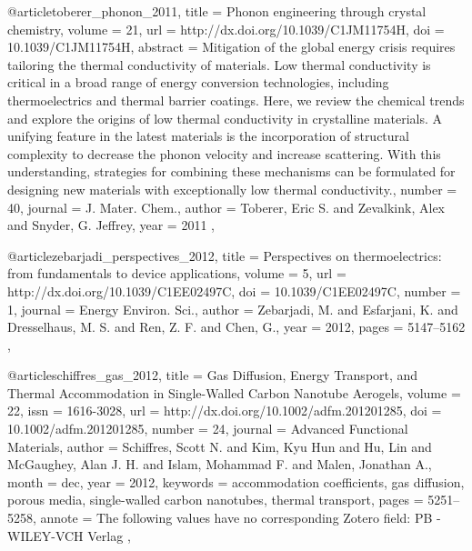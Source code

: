 \documentclass[12pt,twocolumn,iop]{/usr/share/texmf-texlive/tex/latex/iop/iopart}[/usr/share/texmf-texlive/tex/latex/iop/]
\begin{document}
\begin{thebibliography}{1}
@article{toberer_phonon_2011,
	title = {Phonon engineering through crystal chemistry},
	volume = {21},
	url = {http://dx.doi.org/10.1039/C1JM11754H},
	doi = {10.1039/C1JM11754H},
	abstract = {Mitigation of the global energy crisis requires tailoring the thermal conductivity of materials. Low thermal conductivity is critical in a broad range of energy conversion technologies, including thermoelectrics and thermal barrier coatings. Here, we review the chemical trends and explore the origins of low thermal conductivity in crystalline materials. A unifying feature in the latest materials is the incorporation of structural complexity to decrease the phonon velocity and increase scattering. With this understanding, strategies for combining these mechanisms can be formulated for designing new materials with exceptionally low thermal conductivity.},
	number = {40},
	journal = {J. Mater. Chem.},
	author = {Toberer, Eric S. and Zevalkink, Alex and Snyder, G. Jeffrey},
	year = {2011}
},

@article{zebarjadi_perspectives_2012,
	title = {Perspectives on thermoelectrics: from fundamentals to device applications},
	volume = {5},
	url = {http://dx.doi.org/10.1039/C1EE02497C},
	doi = {10.1039/C1EE02497C},
	number = {1},
	journal = {Energy Environ. Sci.},
	author = {Zebarjadi, M. and Esfarjani, K. and Dresselhaus, M. S. and Ren, Z. F. and Chen, G.},
	year = {2012},
	pages = {5147--5162}
},

@article{schiffres_gas_2012,
	title = {Gas Diffusion, Energy Transport, and Thermal Accommodation in Single-Walled Carbon Nanotube Aerogels},
	volume = {22},
	issn = {1616-3028},
	url = {http://dx.doi.org/10.1002/adfm.201201285},
	doi = {10.1002/adfm.201201285},
	number = {24},
	journal = {Advanced Functional Materials},
	author = {Schiffres, Scott N. and Kim, Kyu Hun and Hu, Lin and {McGaughey}, Alan J. H. and Islam, Mohammad F. and Malen, Jonathan A.},
	month = dec,
	year = {2012},
	keywords = {accommodation coefficients, gas diffusion, porous media, single-walled carbon nanotubes, thermal transport},
	pages = {5251--5258},
	annote = {The following values have no corresponding Zotero field:
{PB} - {WILEY-VCH} Verlag
}
},















\end{thebibliography}
\end{document}

